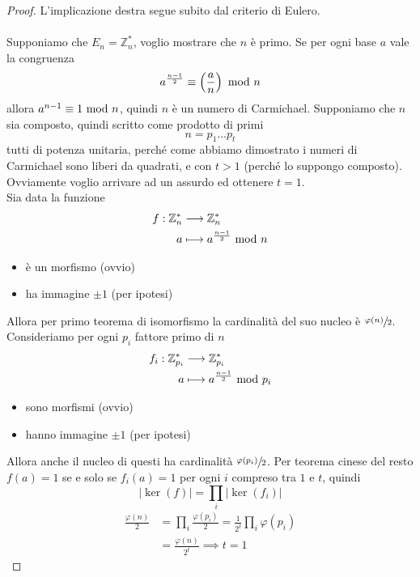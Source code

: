\begin{proof}
	L'implicazione destra segue subito dal criterio di Eulero. \\ \\ Supponiamo che $E_n=\mathbb{Z}_n^*$, voglio mostrare che $n$ è primo. Se per ogni base $a$ vale la congruenza 
	\begin{equation*}
	a^{\frac{n-1}{2}}\equiv\left(\frac{a}{n}\right)\ \mathrm{mod}\ n
	\end{equation*}
	allora $a^{n-1}\equiv1\ \mathrm{mod}\ n$, quindi $n$ è un numero di Carmichael. Supponiamo che $n$ sia composto, quindi scritto come prodotto di primi 
	\begin{equation*}
	n=p_1\dots p_t
	\end{equation*}
	tutti di potenza unitaria, perché come abbiamo dimostrato i numeri di Carmichael sono liberi da quadrati, e con $t>1$ (perché lo suppongo composto). Ovviamente voglio arrivare ad un assurdo ed ottenere $t=1$. \\ Sia data la funzione 
	\begin{align*}
	f:\mathbb{Z}_n^*&\longrightarrow\mathbb{Z}_n^*\\
	a&\longmapsto a^{\frac{n-1}{2}}\ \mathrm{mod}\ n
	\end{align*}
	\begin{itemize}
		\item è un morfismo (ovvio)
		\item ha immagine $\pm1$ (per ipotesi)
	\end{itemize}
	Allora per primo teorema di isomorfismo la cardinalità del suo nucleo è $\sfrac{\varphi(n)}{2}$. \\ Consideriamo per ogni $p_i$ fattore primo di $n$
	\begin{align*}
	f_i:\mathbb{Z}_{p_i}^*&\longrightarrow\mathbb{Z}_{p_i}^*\\
	a&\longmapsto a^{\frac{n-1}{2}}\ \mathrm{mod}\ p_i
	\end{align*}
	\begin{itemize}
		\item sono morfismi (ovvio)
		\item hanno immagine $\pm1$ (per ipotesi)
	\end{itemize}
	Allora anche il nucleo di questi ha cardinalità $\sfrac{\varphi(p_i)}{2}$. Per teorema cinese del resto $f(a)=1$ se e solo se $f_i(a)=1$ per ogni $i$ compreso tra $1$ e $t$, quindi
	\begin{equation*}
	\left|\ker(f)\right|=\prod_i\left|\ker(f_i)\right|
	\end{equation*}
	\begin{align*}
	\frac{\varphi(n)}{2}
	&=\prod_i\frac{\varphi(p_i)}{2}=\frac{1}{2^t}\prod_i\varphi(p_i)\\
	&=\frac{\varphi(n)}{2^t}\implies t=1
	\end{align*}
\end{proof}
